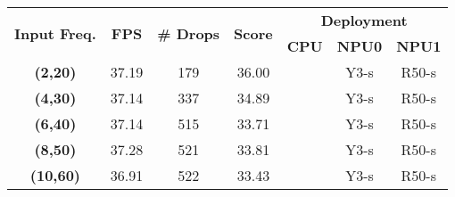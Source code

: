 \begin{tabular}{ccccccc}
\hline 
\multirow{2}{*}{\textbf{Input Freq.}} & \multirow{2}{*}{\textbf{FPS}} & \multirow{2}{*}{\textbf{\# Drops}} & \multirow{2}{*}{\textbf{Score}} & \multicolumn{3}{c}{\textbf{Deployment}}\tabularnewline
\cline{5-7}
 &  &  &  & \textbf{CPU} & \textbf{NPU0} & \textbf{NPU1}\tabularnewline
\hline 
\textbf{(2,20)} & 37.19 & 179 & 36.00 &  & Y3-s & R50-s\tabularnewline
\textbf{(4,30)} & 37.14 & 337 & 34.89 &  & Y3-s & R50-s\tabularnewline
\textbf{(6,40)} & 37.14 & 515 & 33.71 &  & Y3-s & R50-s\tabularnewline
\textbf{(8,50)} & 37.28 & 521 & 33.81 &  & Y3-s & R50-s\tabularnewline
\textbf{(10,60)} & 36.91 & 522 & 33.43 &  & Y3-s & R50-s\tabularnewline
\hline 
\end{tabular}
